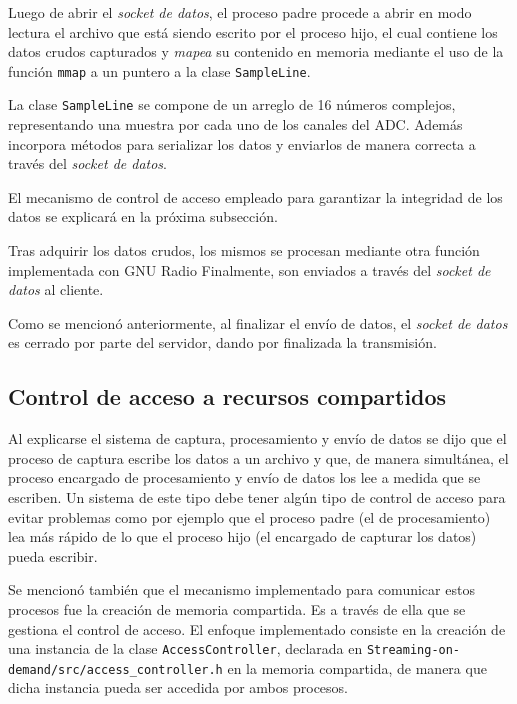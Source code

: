 \documentclass[../../main.tex]{subfiles}
\begin{document}
Luego de abrir el \textit{socket de datos}, el proceso padre procede a abrir en modo lectura el archivo que está siendo escrito por el proceso hijo, el cual contiene los datos crudos capturados y \textit{mapea} su contenido en memoria mediante el uso de la función \texttt{mmap}  a un puntero a la clase \texttt{SampleLine}. 

La clase \texttt{SampleLine} se compone de un arreglo de 16 números complejos, representando una muestra por cada uno de los canales del ADC. Además incorpora métodos para serializar los datos y enviarlos de manera correcta a través del \textit{socket de datos}.

El mecanismo de control de acceso empleado para garantizar la integridad de los datos se explicará en la próxima subsección. 

Tras adquirir los datos crudos, los mismos se procesan mediante otra función implementada con GNU Radio 
Finalmente, son enviados a través del \textit{socket de datos} al cliente.

Como se mencionó anteriormente, al finalizar el envío de datos, el \textit{socket de datos} es cerrado por parte del servidor, dando por finalizada la transmisión.

\subsection{Control de acceso a recursos compartidos}
Al explicarse el sistema de captura, procesamiento y envío de datos se dijo que el proceso de captura escribe los datos a un archivo y que, de manera simultánea, el proceso encargado de procesamiento y envío de datos los lee a medida que se escriben. Un sistema de este tipo debe tener algún tipo de control de acceso para evitar problemas como por ejemplo que el proceso padre (el de procesamiento) lea más rápido de lo que el proceso hijo (el encargado de capturar los datos) pueda escribir.

Se mencionó también que el mecanismo implementado para comunicar estos procesos fue la creación de memoria compartida. Es a través de ella que se gestiona el control de acceso. El enfoque implementado consiste en la creación de una instancia de la clase \texttt{AccessController}, declarada en \texttt{Streaming-on-demand/src/access\_controller.h} en la memoria compartida, de manera que dicha instancia pueda ser accedida por ambos procesos.
\end{document}
